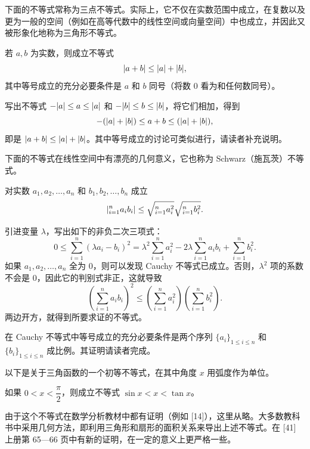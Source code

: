 下面的不等式常称为三点不等式。实际上，它不仅在实数范围中成立，在复数以及更为一般的空间（例如在高等代数中的线性空间或向量空间）中也成立，并因此又被形象化地称为三角形不等式。

\begin{xproposition}[1.3.4（三点不等式）]
若 $a,b$ 为实数，则成立不等式
\[
  \lvert a+b\rvert\le \lvert a\rvert+\lvert b\rvert,
\]
其中等号成立的充分必要条件是 $a$ 和 $b$ 同号（将数 $0$ 看为和任何数同号）。
\end{xproposition}

\begin{xproof}
写出不等式 $-\lvert a\rvert\le a\le\lvert a\rvert$ 和 $-\lvert b\rvert\le b\le\lvert b\rvert$，将它们相加，得到
\[
  -(\lvert a\rvert+\lvert b\rvert)\le a+b\le (\lvert a\rvert+\lvert b\rvert),
\]
即是 $\lvert a+b\rvert\le\lvert a\rvert+\lvert b\rvert$。其中等号成立的讨论可类似进行，请读者补充说明。
\end{xproof}

下面的不等式在线性空间中有漂亮的几何意义，它也称为 Schwarz（施瓦茨）不等式。

\begin{xproposition}
对实数 $a_1,a_2,\ldots,a_n$ 和 $b_1,b_2,\ldots,b_n$ 成立
\[
  \lvert\relax_{i=1}^n a_i b_i\rvert
  \le
  \sqrt{\relax_{i=1}^n a_i^2}\sqrt{\relax_{i=1}^n b_i^2}.
\]
\end{xproposition}

\begin{xproof}
引进变量 $\lambda$，写出如下的非负二次三项式：
\[
  0\le\sum_{i=1}^n(\lambda a_i-b_i)^2
  =\lambda^2\sum_{i=1}^n a_i^2
  -2\lambda\sum_{i=1}^n a_i b_i
  +\sum_{i=1}^n b_i^2.
\]
如果 $a_1,a_2,\ldots,a_n$ 全为 $0$，则可以发现 Cauchy 不等式已成立。否则，$\lambda^2$ 项的系数不会是 $0$，因此它的判别式非正，这就导致
\[
  \left(\sum_{i=1}^n a_i b_i\right)^2
  \le
  \left(\sum_{i=1}^n a_i^2\right)
  \left(\sum_{i=1}^n b_i^2\right).
\]
两边开方，就得到所要求证的不等式。
\end{xproof}

\begin{xremark}
在 Cauchy 不等式中等号成立的充分必要条件是两个序列 $\{a_i\}_{1\le i\le n}$ 和 $\{b_i\}_{1\le i\le n}$ 成比例。其证明请读者完成。
\end{xremark}

以下是关于三角函数的一个初等不等式，在其中角度 $x$ 用弧度作为单位。

\begin{xproposition}[1.3.6]
如果 $0<x<\dfrac\pi2$，则成立不等式 $\sin x<x<\tan x$。
\end{xproposition}

\begin{xremark}
由于这个不等式在数学分析教材中都有证明（例如 [14]），这里从略。大多数教科书中采用几何方法，即利用三角形和扇形的面积关系来导出上述不等式。在 [41] 上册第 65—66 页中有新的证明，在一定的意义上更严格一些。
\end{xremark}

